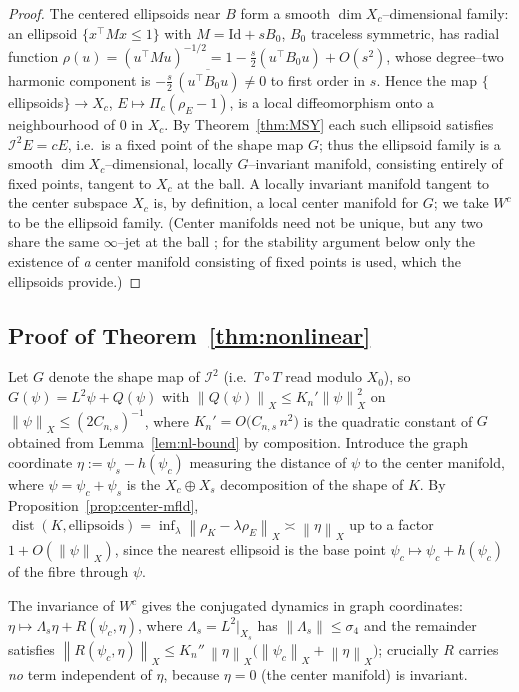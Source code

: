\documentclass[10pt,a4paper]{amsart}
\newcommand{\IB}{\mathcal{I}}
\newcommand{\norm}[1]{\left\lVert #1 \right\rVert}
\DeclareMathOperator{\dist}{dist}
\begin{document}
\begin{proof}
The centered ellipsoids near $B$ form a smooth $\dim X_c$--dimensional family:
an ellipsoid $\{x^\top M x\le1\}$ with $M=\mathrm{Id}+sB_0$, $B_0$ traceless
symmetric, has radial function $\rho(u)=(u^\top M u)^{-1/2}
=1-\tfrac{s}{2}(u^\top B_0 u)+O(s^2)$, whose degree--two harmonic component is
$-\tfrac{s}{2}\,\overline{(u^\top B_0 u)}\neq0$ to first order in $s$. Hence the
map $\{$ellipsoids$\}\to X_c$, $E\mapsto \Pi_c(\rho_E-1)$, is a local
diffeomorphism onto a neighbourhood of $0$ in $X_c$. By
Theorem~\ref{thm:MSY} each such ellipsoid satisfies $\IB^2E=cE$, i.e.\ is a
fixed point of the shape map $G$; thus the ellipsoid family is a smooth
$\dim X_c$--dimensional, locally $G$--invariant manifold, consisting entirely of
fixed points, tangent to $X_c$ at the ball. A locally invariant manifold
tangent to the center subspace $X_c$ is, by definition, a local center manifold
for $G$; we take $W^c$ to be the ellipsoid family. (Center manifolds need not be
unique, but any two share the same $\infty$--jet at the ball
\cite{VanderbauwhedeIooss1992}; for the stability argument below only the
existence of \emph{a} center manifold consisting of fixed points is used, which
the ellipsoids provide.)
\end{proof}

\subsection{Proof of Theorem~\ref{thm:nonlinear}}
Let $G$ denote the shape map of $\IB^2$ (i.e.\ $T\circ T$ read modulo $X_0$),
so $G(\psi)=L^2\psi+Q(\psi)$ with $\norm{Q(\psi)}_X\le K_n'\norm\psi_X^2$ on
$\norm\psi_X\le(2C_{n,s})^{-1}$, where $K_n'=O\big(C_{n,s}\,n^2\big)$ is the
quadratic constant of $G$ obtained from Lemma~\ref{lem:nl-bound} by composition.
Introduce the graph coordinate $\eta:=\psi_s-h(\psi_c)$ measuring the distance
of $\psi$ to the center manifold, where $\psi=\psi_c+\psi_s$ is the
$X_c\oplus X_s$ decomposition of the shape of $K$. By
Proposition~\ref{prop:center-mfld}, $\dist(K,\text{ellipsoids})
=\inf_{\lambda}\norm{\rho_K-\lambda\rho_E}_X\asymp\norm\eta_X$ up to a factor
$1+O(\norm\psi_X)$, since the nearest ellipsoid is the base point
$\psi_c\mapsto\psi_c+h(\psi_c)$ of the fibre through $\psi$.

The invariance of $W^c$ gives the conjugated dynamics in graph coordinates:
$\eta\mapsto \Lambda_s\eta + R(\psi_c,\eta)$, where $\Lambda_s=L^2|_{X_s}$ has
$\norm{\Lambda_s}\le\sigma_4$ and the remainder satisfies
$\norm{R(\psi_c,\eta)}_X\le K_n''\,\norm\eta_X\big(\norm{\psi_c}_X
+\norm\eta_X\big)$; crucially $R$ carries \emph{no} term independent of $\eta$,
because $\eta=0$ (the center manifold) is invariant.
\end{document}
